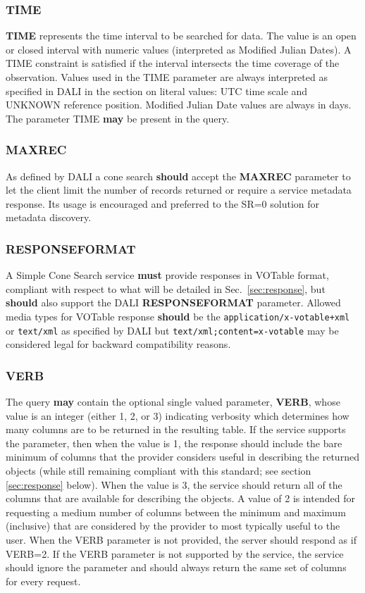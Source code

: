 \documentclass[11pt,a4paper]{ivoa}
\begin{document}
\subsubsection{TIME} \textbf{TIME} represents the time interval to be
searched for data. The value is an open or closed interval with numeric
values (interpreted as Modified Julian Dates). A TIME constraint is
satisfied if the interval intersects the time coverage of the
observation. Values used in the TIME parameter are always interpreted as
specified in DALI in the section on literal values: UTC time scale and
UNKNOWN reference position. Modified Julian Date values are always in
days. The parameter TIME \textbf{may} be present in the query. 

\subsubsection{MAXREC} As defined by DALI a cone search \textbf{should}
accept the \textbf{MAXREC} parameter to let the client limit the number
of records returned or require a service metadata response.
Its usage is encouraged and preferred to the SR=0 solution for metadata
discovery.

\subsubsection{RESPONSEFORMAT} \label{subsubsec:responseformat} A
Simple Cone Search service \textbf{must} provide responses in VOTable
\citep{2019ivoa.spec.1021O} format, compliant with respect to what will be
detailed in Sec.~\ref{sec:response}, but \textbf{should} also support
the DALI \textbf{RESPONSEFORMAT} parameter. Allowed media types for
VOTable response \textbf{should} be the
\texttt{application/x-votable+xml} or \texttt{text/xml} as specified by
DALI but \texttt{text/xml;content=x-votable} may be considered legal for
backward compatibility reasons.

\subsubsection{VERB} The query \textbf{may} contain the optional single
valued parameter, \textbf{VERB}, whose value is an integer (either 1, 2,
or 3) indicating verbosity which determines how many columns are to be
returned in the resulting table. If the service supports the parameter,
then when the value is 1, the response should include the bare minimum
of columns that the provider considers useful in describing the returned
objects (while still remaining compliant with this standard; see section
\ref{sec:response} below). When the value is 3, the service should
return all of the columns that are available for describing the objects.
A value of 2 is intended for requesting a medium number of columns
between the minimum and maximum (inclusive) that are considered by the
provider to most typically useful to the user. When the VERB parameter
is not provided, the server should respond as if VERB=2. If the VERB
parameter is not supported by the service, the service should ignore the
parameter and should always return the same set of columns for every
request.
\end{document}
